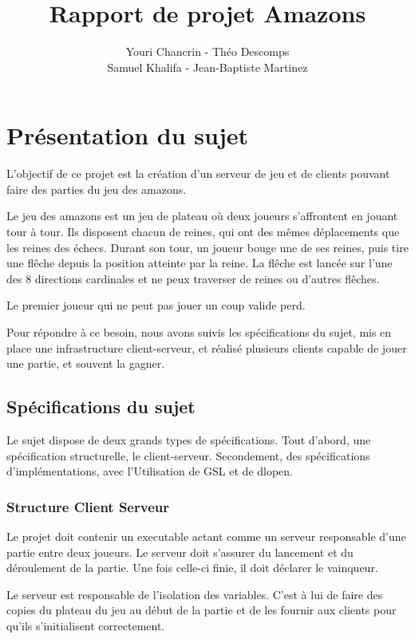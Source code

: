 \documentclass{article}
\author{Youri Chancrin - Théo Descomps\\Samuel Khalifa - Jean-Baptiste Martinez}
\title{Rapport de projet Amazons}
\begin{document}
\maketitle

\section{Présentation du sujet}

L'objectif de ce projet est la création d'un serveur de jeu et de clients pouvant faire des parties 
du jeu des amazons.

Le jeu des amazons est un jeu de plateau où deux joueurs s'affrontent en jouant tour à tour.
Ils disposent chacun de reines, qui ont des mêmes déplacements que les reines des échecs.
Durant son tour, un joueur bouge une de ses reines, puis tire une flêche depuis la position atteinte par la reine.
La flêche est lancée sur l'une des 8 directions cardinales et ne peux traverser de reines ou d'autres flêches.

Le premier joueur qui ne peut pas jouer un coup valide perd.

Pour répondre à ce besoin, nous avons suivis les spécifications du sujet,
mis en place une infrastructure client-serveur, et réalisé plusieurs clients 
capable de jouer une partie, et souvent la gagner.

\subsection{Spécifications du sujet}
Le sujet dispose de deux grands types de spécifications.
Tout d'abord, une spécification structurelle, le client-serveur.
Secondement, des spécifications d'implémentations, avec l'Utilisation 
de GSL et de dlopen.

\subsubsection{Structure Client Serveur}

Le projet doit contenir un executable actant comme un serveur responsable d'une partie entre deux joueurs.
Le serveur doit s'assurer du lancement et du déroulement de la partie. Une fois celle-ci finie, 
il doit déclarer le vainqueur.

Le serveur est responsable de l'isolation des variables. 
C'est à lui de faire des copies du plateau du jeu au début de la partie et de les fournir aux clients 
pour qu'ils s'initialisent correctement.
\end{document}
